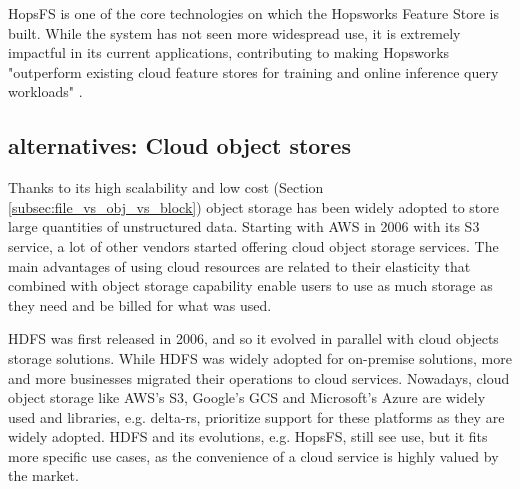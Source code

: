 \gls{HopsFS} is one of the core technologies on which the Hopsworks Feature Store is built. While the system has not seen more widespread use, it is extremely impactful in its current applications, contributing to making Hopsworks "outperform existing cloud feature stores for training and online inference query workloads" \cite{10.1145/3626246.3653389}. 

\subsection{ alternatives: Cloud object stores}

Thanks to its high scalability and low cost (Section \ref{subsec:file_vs_obj_vs_block}) object storage has been widely adopted to store large quantities of unstructured data. Starting with \gls{AWS} in 2006 with its S3 service, a lot of other vendors started offering cloud object storage services. The main advantages of using cloud resources are related to their elasticity that combined with object storage capability enable users to use as much storage as they need and be billed for what was used. 

\gls{HDFS} was first released in 2006, and so it evolved in parallel with cloud objects storage solutions. While \gls{HDFS} was widely adopted for on-premise solutions, more and more businesses migrated their operations to cloud services. Nowadays, cloud object storage like \gls{AWS}'s S3, Google's \gls{GCS} and Microsoft's Azure are widely used and libraries, e.g. delta-rs, prioritize support for these platforms as they are widely adopted. \gls{HDFS} and its evolutions, e.g. \gls{HopsFS}, still see use, but it fits more specific use cases, as the convenience of a cloud service is highly valued by the market.